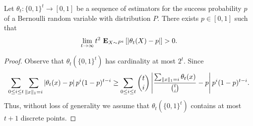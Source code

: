 
\begin{theorem}
  Let $\theta_t: \{0,1\}^t \to [0,1]$ be a sequence of estimators for
  the success probability $p$ of a Bernoulli random variable with
  distribution $P$.
  There exists $p \in [0,1]$ such that
  \[
   \lim_{t\to \infty} t^2\ \Expnew{X \sim P^t}{\lp| \theta_t(X) - p \rp|} > 0.
  \]
\end{theorem}
\begin{proof}
  Observe that $\theta_t(\{0,1\}^t)$ has cardinality at most $2^t$.
  Since
  \[
    \sum_{0 \leq i \leq t} \sum_{\norm{1}{x} = i}
    \lp| \theta_t(x) - p \rp| p^i (1-p)^{t-i}
    \geq
    \sum_{0 \leq i \leq t} \binom{t}{i} \lp|
     \frac{\sum_{\norm{1}{x} = i} \theta_t(x)}{\binom{t}{i}}  - p \rp|
    p^i (1-p)^{t-i}.
  \]
  Thus, without loss of generality we assume that
  $\theta_t(\{0,1\}^t)$ contains at most $t+1$ discrete
  points.


\end{proof}
